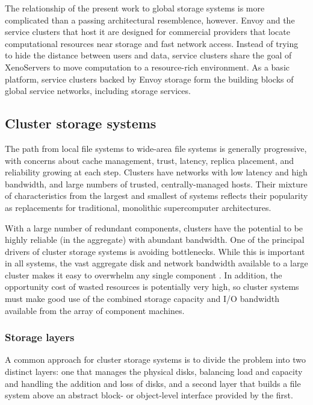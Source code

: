 The relationship of the present work to global storage systems is more complicated than a passing architectural resemblence, however. Envoy and the service clusters that host it are designed for commercial providers that locate computational resources near storage and fast network access. Instead of trying to hide the distance between users and data, service clusters share the goal of XenoServers \cite{reed} to move computation to a resource-rich environment. As a basic platform, service clusters backed by Envoy storage form the building blocks of global service networks, including storage services.

\subsection{Cluster storage systems}

The path from local file systems to wide-area file systems is generally progressive, with concerns about cache management, trust, latency, replica placement, and reliability growing at each step. Clusters have networks with low latency and high bandwidth, and large numbers of trusted, centrally-managed hosts. Their mixture of characteristics from the largest and smallest of systems reflects their popularity as replacements for traditional, monolithic supercomputer architectures.

With a large number of redundant components, clusters have the potential to be highly reliable (in the aggregate) with abundant bandwidth. One of the principal drivers of cluster storage systems is avoiding bottlenecks. While this is important in all systems, the vast aggregate disk and network bandwidth available to a large cluster makes it easy to overwhelm any single component \cite{hospodor}. In addition, the opportunity cost of wasted resources is potentially very high, so cluster systems must make good use of the combined storage capacity and I/O bandwidth available from the array of component machines.

\subsubsection{Storage layers}\label{sec:storage-layer-systems}

A common approach for cluster storage systems is to divide the problem into two distinct layers: one that manages the physical disks, balancing load and capacity and handling the addition and loss of disks, and a second layer that builds a file system above an abstract block- or object-level interface provided by the first.

